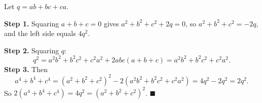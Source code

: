 Let $q=ab+bc+ca$.

\textbf{Step 1.} Squaring $a+b+c=0$ gives $a^2+b^2+c^2+2q=0$, so $a^2+b^2+c^2=-2q$, and the left side equals $4q^2$.

\textbf{Step 2.} Squaring $q$:
\[
q^2=a^2b^2+b^2c^2+c^2a^2+2abc(a+b+c)=a^2b^2+b^2c^2+c^2a^2 .
\]
\textbf{Step 3.} Then
\[
a^4+b^4+c^4=\left(a^2+b^2+c^2\right)^2-2\left(a^2b^2+b^2c^2+c^2a^2\right)=4q^2-2q^2=2q^2 .
\]
So $2(a^4+b^4+c^4)=4q^2=(a^2+b^2+c^2)^2$. $\blacksquare$
